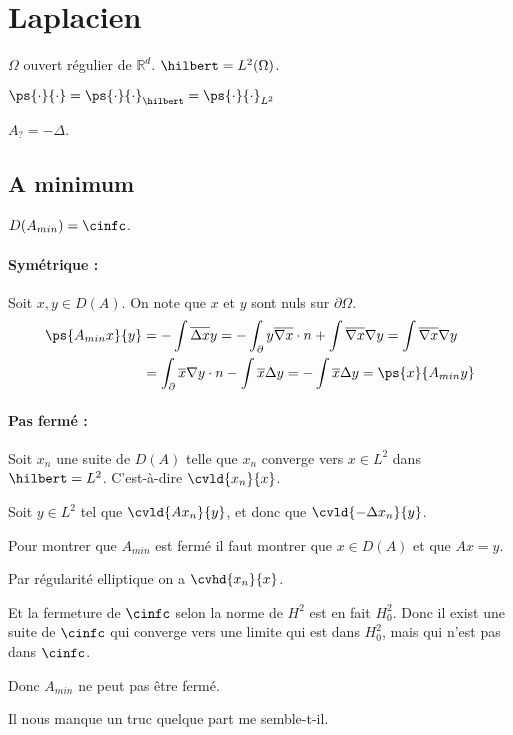 
\section{Laplacien}

$\Omega$ ouvert régulier de $\mathbb{R}^d$.
$\hilbert = L^2(\Omega)$.

$\ps{\cdot}{\cdot} = \ps{\cdot}{\cdot}_{\hilbert} = \ps{\cdot}{\cdot}_{L^2}$

$A_? = -\Delta$.

\subsection{A minimum}

$D(A_{min}) = \cinfc$.

\paragraph{Symétrique :} Soit $x, y \in D(A)$. On note que $x$ et $y$ sont nuls sur
$\partial \Omega$.
%
\begin{align}
    \ps{A_{min} x}{y} &= -\int \overline{\Delta x} y
    = -\int_\partial y \overline{\nabla x} \cdot n + \int \overline{\nabla x} \nabla y
    = \int \overline{\nabla x} \nabla y \\
    &= \int_\partial \overline{x} \nabla y \cdot n - \int \overline{x} \Delta y
    = -\int \overline{x} \Delta y = \ps{x}{A_{min} y}
\end{align}

\paragraph{Pas fermé :} Soit $x_n$ une suite de $D(A)$ telle que $x_n$ converge
vers $x \in L^2$ dans $\hilbert = L^2$.
C'est-à-dire $\cvld{x_n}{x}$.

Soit $y \in L^2$ tel que $\cvld{Ax_n}{y}$, et donc que $\cvld{-\Delta x_n}{y}$.

Pour montrer que $A_{min}$ est fermé il faut montrer que $x \in D(A)$ et
que $Ax = y$.

Par régularité elliptique on a $\cvhd{x_n}{x}$.

Et la fermeture de $\cinfc$ selon la norme de $H^2$ est en fait $H_0^2$.
Donc il exist une suite de $\cinfc$ qui converge vers une limite
qui est dans $H_0^2$, mais qui n'est pas dans $\cinfc$.

Donc $A_{min}$ ne peut pas être fermé.

Il nous manque un truc quelque part me semble-t-il.

